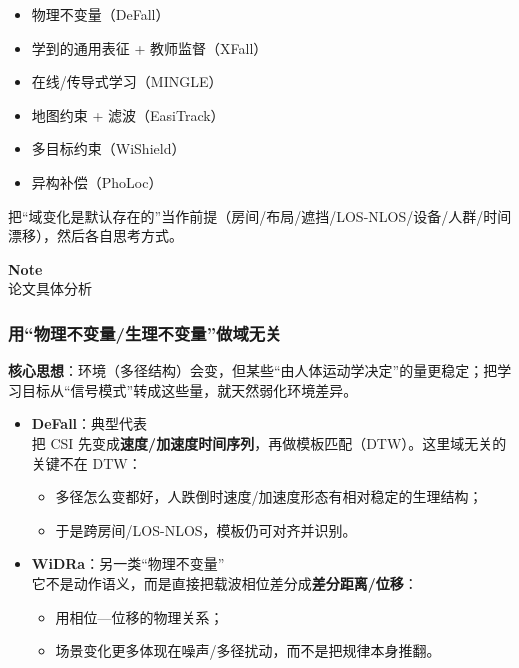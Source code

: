 \documentclass[
]{article}
\begin{document}
\begin{itemize}
\item
  物理不变量（DeFall）
\item
  学到的通用表征 + 教师监督（XFall）
\item
  在线/传导式学习（MINGLE）
\item
  地图约束 + 滤波（EasiTrack）
\item
  多目标约束（WiShield）
\item
  异构补偿（PhoLoc）
\end{itemize}

把``域变化是默认存在的''当作前提（房间/布局/遮挡/LOS-NLOS/设备/人群/时间漂移），然后各自思考方式。

\textbf{Note}\\

论文具体分析

\subsubsection{用``物理不变量/生理不变量''做域无关}\label{ux7528ux7269ux7406ux4e0dux53d8ux91cfux751fux7406ux4e0dux53d8ux91cfux505aux57dfux65e0ux5173}

\textbf{核心思想}：环境（多径结构）会变，但某些``由人体运动学决定''的量更稳定；把学习目标从``信号模式''转成这些量，就天然弱化环境差异。

\begin{itemize}
\item
  \textbf{DeFall}：典型代表\\
  把 CSI
  先变成\textbf{速度/加速度时间序列}，再做模板匹配（DTW）。这里域无关的关键不在
  DTW：

  \begin{itemize}
  \item
    多径怎么变都好，人跌倒时速度/加速度形态有相对稳定的生理结构；
  \item
    于是跨房间/LOS-NLOS，模板仍可对齐并识别。
  \end{itemize}
\item
  \textbf{WiDRa}：另一类``物理不变量''\\
  它不是动作语义，而是直接把载波相位差分成\textbf{差分距离/位移}：

  \begin{itemize}
  \item
    用相位---位移的物理关系；
  \item
    场景变化更多体现在噪声/多径扰动，而不是把规律本身推翻。
  \end{itemize}
\end{itemize}
\end{document}
